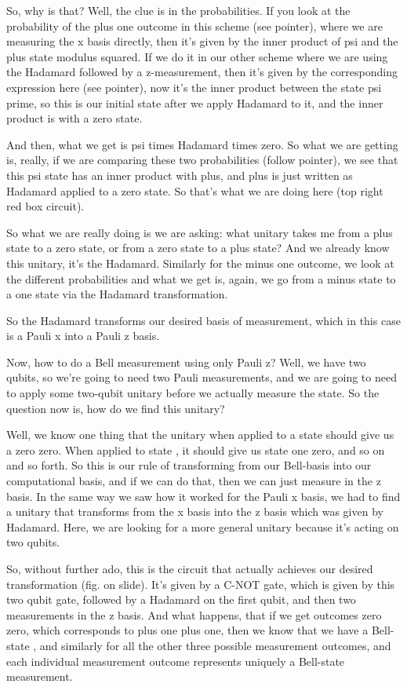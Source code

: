 So, why is that? Well, the clue is in the probabilities. If you look at the probability of the plus one outcome in this scheme (see pointer), where we are measuring the x basis directly, then it's given by the inner product of psi and the plus state modulus squared. If we do it in our other scheme where we are using the Hadamard followed by a z-measurement, then it's given by the corresponding expression here (see pointer), now it's the inner product between the state psi prime, so this is our initial state after we apply Hadamard to it, and the inner product is with a zero state.

And then, what we get is psi times Hadamard times zero. So what we are getting is, really, if we are comparing these two probabilities (follow pointer), we see that this psi state has an inner product with plus, and plus is just written as Hadamard applied to a zero state. So that's what we are doing here (top right red box circuit).

So what we are really doing is we are asking: what unitary takes me from a plus state to a zero state, or from a zero state to a plus state? And we already know this unitary, it's the Hadamard. Similarly for the minus one outcome, we look at the different probabilities and what we get is, again, we go from a minus state to a one state via the Hadamard transformation.

So the Hadamard transforms our desired basis of measurement, which in this case is a Pauli x into a Pauli z basis.

Now, how to do a Bell measurement using only Pauli z? Well, we have two qubits, so we're going to need two Pauli measurements, and we are going to need to apply some two-qubit unitary before we actually measure the state. So the question now is, how do we find this unitary?

Well, we know one thing that the unitary when applied to a state \ket{\Psi^+} should give us a zero zero. When applied to state \ket{\Phi^-}, it should give us state one zero, and so on and so forth. So this is our rule of transforming from our Bell-basis into our computational basis, and if we can do that, then we can just measure in the z basis. In the same way we saw how it worked for the Pauli x basis, we had to find a unitary that transforms from the x basis into the z basis which was given by Hadamard. Here, we are looking for a more general unitary because it's acting on two qubits.

So, without further ado, this is the circuit that actually achieves our desired transformation (fig. on slide). It's given by a C-NOT gate, which is given by this two qubit gate, followed by a Hadamard on the first qubit, and then two measurements in the z basis. And what happens, that if we get outcomes zero zero, which corresponds to plus one plus one, then we know that we have a Bell-state \ket{\Phi^+}, and similarly for all the other three possible measurement outcomes, and each individual measurement outcome represents uniquely a Bell-state measurement.

